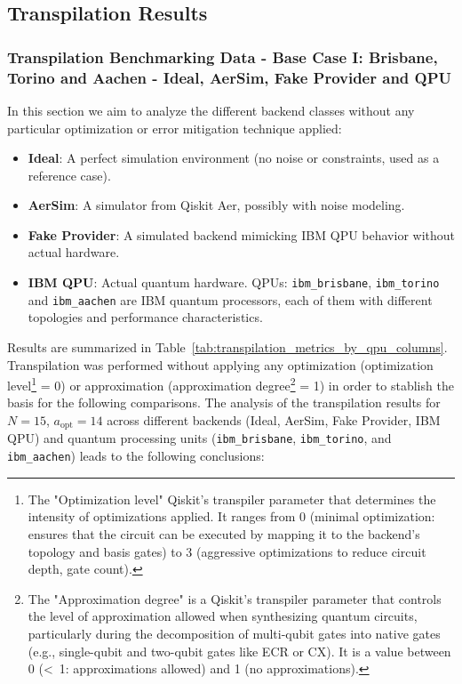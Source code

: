 \documentclass[conference,twoside]{IEEEtran}
\begin{document}
\subsection{Transpilation Results}
\subsubsection{Transpilation Benchmarking Data - Base Case I: Brisbane, Torino and Aachen - Ideal, AerSim, Fake Provider and QPU}

In this section we aim to analyze the different backend classes without any particular optimization or error mitigation technique applied:
\begin{itemize}
\item \textbf{Ideal}: A perfect simulation environment (no noise or constraints, used as a reference case).
\item \textbf{AerSim}: A simulator from Qiskit Aer, possibly with noise modeling.
\item \textbf{Fake Provider}: A simulated backend mimicking IBM QPU behavior without actual hardware.
\item \textbf{IBM QPU}: Actual quantum hardware. QPUs: \texttt{ibm\_brisbane}, \texttt{ibm\_torino} and \texttt{ibm\_aachen} are IBM quantum processors, each of them with different topologies and performance characteristics.
\end{itemize}

Results are summarized in Table~\ref{tab:transpilation_metrics_by_qpu_columns}. Transpilation was performed without applying any optimization (optimization level\footnote{The "Optimization level" Qiskit's transpiler parameter that determines the intensity of optimizations applied. It ranges from 0  (minimal optimization: ensures that the circuit can be executed by mapping it to the backend's topology and basis gates) to 3 (aggressive optimizations to reduce circuit depth, gate count).} = 0) or approximation (approximation degree\footnote{The "Approximation  degree" is a Qiskit's transpiler parameter that controls the level of approximation allowed when synthesizing quantum circuits, particularly during the decomposition of multi-qubit gates into native gates (e.g., single-qubit and two-qubit gates like ECR or CX). It is a value between 0 (\textless\ 1: approximations allowed) and 1 (no approximations).} = 1) in order to stablish the basis for the following comparisons. The analysis of the transpilation results for \(N=15\), \(a_{\text{opt}} = 14\) across different backends (Ideal, AerSim, Fake Provider, IBM QPU) and quantum processing units (\texttt{ibm\_brisbane}, \texttt{ibm\_torino}, and \texttt{ibm\_aachen}) leads to the following conclusions:
\end{document}
